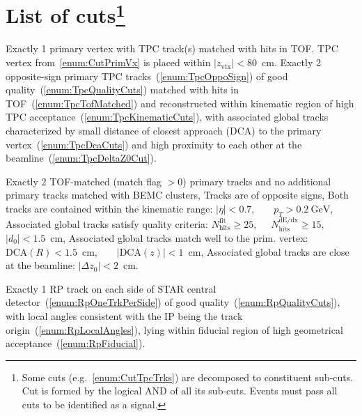 \section[List of cuts]{List of cuts\footnote{Some cuts (e.g.~\ref{enum:CutTpcTrks}) are decomposed to constituent sub-cuts. Cut is formed by the logical AND of all its sub-cuts. Events must pass all cuts to be identified as a signal.}}\label{sec:listOfCuts}
\begin{enumerate}[label=\textbf{\hyperref[sec:C\arabic*]{C\arabic*}},ref=C\arabic*]
 \itemm Exactly 1 primary vertex with TPC track(s) matched with hits in TOF.\label{enum:CutPrimVx}
 \itemm TPC vertex from~\ref{enum:CutPrimVx} is placed within $|z_{\text{vtx}}|<80$~cm.\label{enum:CutZVx}
 \itemm Exactly 2 opposite-sign primary TPC tracks~(\ref{enum:TpcOppoSign}) of good quality~(\ref{enum:TpcQualityCuts}) matched with hits in TOF~(\ref{enum:TpcTofMatched}) and reconstructed within kinematic region of high TPC acceptance~(\ref{enum:TpcKinematicCuts}), with associated global tracks characterized by small distance of closest approach (DCA) to the primary vertex~(\ref{enum:TpcDcaCuts}) and high proximity to each other at the beamline~(\ref{enum:TpcDeltaZ0Cut}).\label{enum:CutTpcTrks}
    \begin{enumerate}[label=\textbf{\theenumi.\arabic*},ref=\theenumi.\arabic*]
      \itemm Exactly 2 TOF-matched (match flag $>0$) primary tracks and no additional primary tracks matched with BEMC clusters,\label{enum:TpcTofMatched}
      \itemm Tracks are of opposite signs,\label{enum:TpcOppoSign}
      \itemm Both tracks are contained within the kinematic range:\label{enum:TpcKinematicCuts}\hspace*{13pt}
      $|\eta|<0.7$,~~~~$p_{T}>0.2~\text{GeV}$,
      \itemm Associated global tracks satisfy quality criteria:\label{enum:TpcQualityCuts}\hspace*{44pt}
      $N_{\text{hits}}^{\text{fit}}\geq25$,~~~$N_{\text{hits}}^{\text{dE/dx}}\geq15$,~~~$|d_{0}|<1.5$~cm,
      \itemm Associated global tracks match well to the prim. vertex:\label{enum:TpcDcaCuts}\hspace*{3.5pt}
      $\text{DCA}(R)<1.5$~cm,~~~~$|\text{DCA}(z)|<1$~cm,
      \itemm Associated global tracks are close at the beamline:\label{enum:TpcDeltaZ0Cut}\hspace*{29pt}
      $|\Delta z_{0}|<2$~cm.
    \end{enumerate}
 \itemm Exactly 1 RP track on each side of STAR central detector~(\ref{enum:RpOneTrkPerSide}) of good quality~(\ref{enum:RpQualityCuts}), with local angles consistent with the IP being the track origin~(\ref{enum:RpLocalAngles}), lying within fiducial region of high geometrical acceptance~(\ref{enum:RpFiducial}).\label{enum:CutRpTrks}

\end{enumerate}
